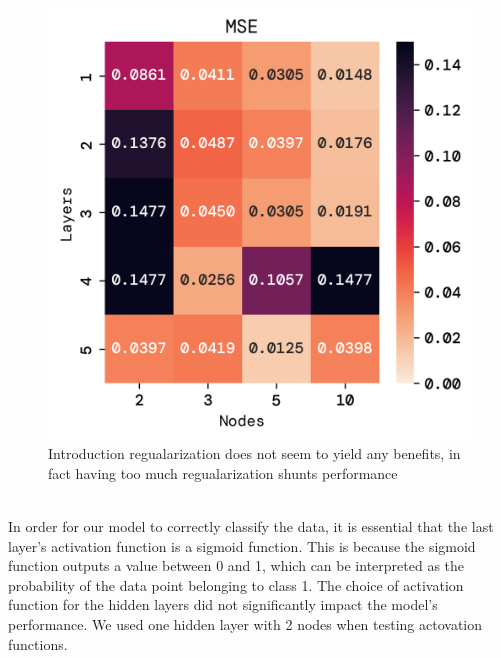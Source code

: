 \documentclass[twoside,11pt]{report}
\begin{document}
\begin{figure}[!ht]
\begin{minipage}[t]{0.5\textwidth - 1mm}
\begin{center}
                \includegraphics[width=\textwidth]{../runsAndFigures/MSE_layers_nodes.png}
            \end{center}
            \caption{Introduction regualarization does not seem to yield any benefits, in fact
            having too much regualarization shunts performance}\label{fig:accuracy_aplha}
        \end{minipage}
    \end{figure}

    \noindent
    \\
    In order for our model to correctly classify the data, it is essential that the last layer's activation function
    is a sigmoid function. This is because the sigmoid function outputs a value between 0 and 1, which can be
    interpreted as the probability of the data point belonging to class 1. The choice of activation function for the
    hidden layers did not significantly impact the model's performance.
    We used one hidden layer with 2 nodes when testing actovation functions.
\end{document}
